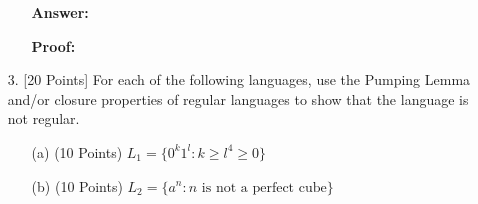 \documentclass[12pt]{article}
\begin{document}
\begin{spacing}{1.5}
\begin{enumerate}
\begin{enumerate}
                              \textbf{Answer:}

                              \textbf{Proof:}
                  \end{enumerate}

                  \newpage
            \item[3.] [20 Points] For each of the following languages, use the Pumping Lemma and/or closure properties of regular languages to show that the language is not regular.

                  \begin{enumerate}
                        \item[(a)] (10 Points) $L_1=\{0^k1^l : k \geq l^4 \geq 0\}$

                        \item[(b)] (10 Points) $L_2=\{a^n : n \text{ is not a perfect cube}\}$
                  \end{enumerate}

      \end{enumerate}

\end{spacing}
\end{document}
